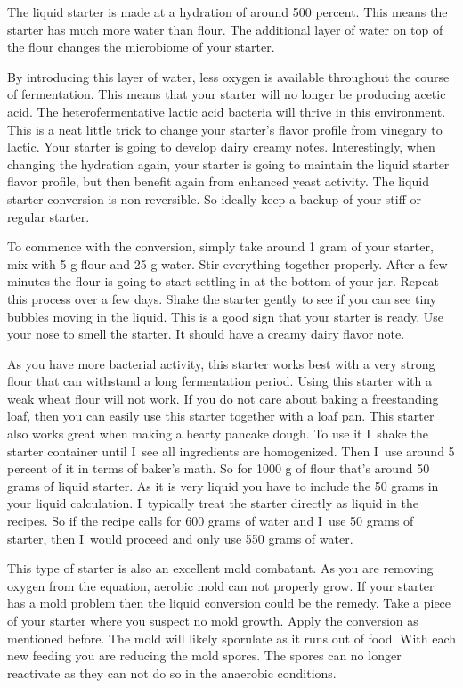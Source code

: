 The liquid starter is made at a hydration of around 500 percent. This means
the starter has much more water than flour. The additional layer of water on
top of the flour changes the microbiome of your starter.

By introducing this layer of water, less oxygen is available throughout the
course of fermentation. This means that your starter will no longer be
producing acetic acid. The heterofermentative lactic acid bacteria will thrive
in this environment. This is a neat little trick to change your starter's
flavor profile from vinegary to lactic. Your starter is going to develop
dairy creamy notes. Interestingly, when changing the hydration again, your starter
is going to maintain the liquid starter flavor profile, but then benefit again
from enhanced yeast activity. The liquid starter conversion is non reversible.
So ideally keep a backup of your stiff or regular starter.

To commence with the
conversion, simply take around 1 gram of your starter, mix with 5 g flour and
25 g water. Stir everything together properly. After a few minutes the flour is
going to start settling in at the bottom of your jar. Repeat this process over
a few days. Shake the starter gently to see if you can see tiny  bubbles
moving in the liquid. This is a good sign that your starter is ready. Use your
nose to smell the starter. It should have a creamy dairy flavor note.

As you have more bacterial activity, this starter works best with a very strong
flour that can withstand a long fermentation period. Using this starter with a
weak wheat flour will not work. If you do not care about baking a freestanding loaf,
then you can easily use this starter together with a loaf pan.
This starter also works great when making a hearty pancake dough. To use it
I~shake the starter container until I~see all ingredients are homogenized.  Then
I~use around 5 percent of it in terms of baker's math. So for 1000 g of flour
that's around 50 grams of liquid starter. As it is very liquid you have to
include the 50 grams in your liquid calculation. I~typically treat the starter
directly as liquid in the recipes. So if the recipe calls for 600 grams of water
and I~use 50 grams of starter, then I~would proceed and only use 550 grams of
water.

This type of starter is also an excellent mold combatant. As you are removing
oxygen from the equation, aerobic mold can not properly grow. If your starter
has a mold problem then the liquid conversion could be the remedy. Take a
piece of your starter where you suspect no mold growth. Apply the conversion
as mentioned before. The mold will likely sporulate as it runs out of food.
With each new feeding you are reducing the mold spores. The spores can no
longer reactivate as they can not do so in the anaerobic conditions.

